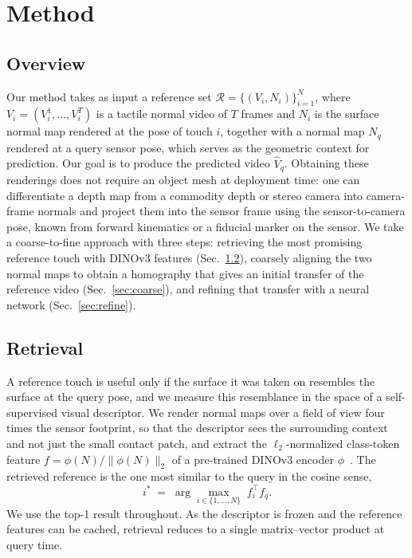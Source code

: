 \section{Method}
\label{sec:method}

\subsection{Overview}

Our method takes as input a reference set
$\mathcal{R} = \{ (V_i, N_i) \}_{i=1}^{N}$, where $V_i = (V_i^1, \dots, V_i^T)$ is a tactile normal
video of $T$ frames and $N_i$ is the surface normal map rendered at the pose of touch $i$, together
with a normal map $N_q$ rendered at a query sensor pose, which serves as the geometric context for
prediction. Our goal is to produce the predicted video $\hat{V}_q$. Obtaining these renderings does
not require an object mesh at deployment time: one can differentiate a depth map from a commodity
depth or stereo camera into camera-frame normals and project them into the sensor frame using the
sensor-to-camera pose, known from forward kinematics or a fiducial marker on the sensor. We take a coarse-to-fine approach with three steps: retrieving
the most promising reference touch with DINOv3 features (Sec.~\ref{sec:retrieval}), coarsely
aligning the two normal maps to obtain a homography that gives an initial transfer of the reference
video (Sec.~\ref{sec:coarse}), and refining that transfer with a neural network
(Sec.~\ref{sec:refine}).

\subsection{Retrieval}
\label{sec:retrieval}

A reference touch is useful only if the surface it was taken on resembles the surface at the query
pose, and we measure this resemblance in the space of a self-supervised visual descriptor. We render
normal maps over a field of view four times the sensor footprint, so that the descriptor sees the
surrounding context and not just the small contact patch, and extract the $\ell_2$-normalized
class-token feature $f=\phi(N)/\lVert \phi(N) \rVert_2$ of a pre-trained DINOv3 encoder
$\phi$~\cite{dinov3}. The retrieved reference is the one most similar to the query in the cosine
sense,
\begin{equation}
  i^{*} \;=\; \arg\max_{i \in \{1,\dots,N\}} \; f_i^{\top} f_q .
  \label{eq:retrieval}
\end{equation}
We use the top-1 result throughout. As the descriptor is frozen and the reference features can be
cached, retrieval reduces to a single matrix--vector product at query time.

